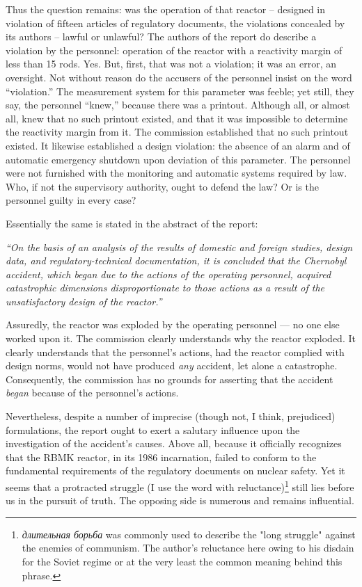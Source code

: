 \documentclass[openright]{bookest}
\begin{document}
Thus the question remains: was the operation of that reactor -- designed in violation of fifteen articles of regulatory documents, the violations concealed by its authors -- lawful or unlawful? The authors of the report do describe a violation by the personnel: operation of the reactor with a reactivity margin of less than \num{15} rods. Yes. But, first, that was not a violation; it was an error, an oversight. Not without reason do the accusers of the personnel insist on the word ``violation.'' The measurement system for this parameter was feeble; yet still, they say, the personnel ``knew,'' because there was a printout. Although all, or almost all, knew that no such printout existed, and that it was impossible to determine the reactivity margin from it. The commission established that no such printout existed. It likewise established a design violation: the absence of an alarm and of automatic emergency shutdown upon deviation of this parameter. The personnel were not furnished with the monitoring and automatic systems required by law. Who, if not the supervisory authority, ought to defend the law? Or is the personnel guilty in every case?

Essentially the same is stated in the abstract of the report:

\begin{personal}
\textit{``On the basis of an analysis of the results of domestic and foreign studies, design data, and regulatory-technical documentation, it is concluded that the Chernobyl accident, which began due to the actions of the operating personnel, acquired catastrophic dimensions disproportionate to those actions as a result of the unsatisfactory design of the reactor.''}
\end{personal}

Assuredly, the reactor was exploded by the operating personnel --- no one else worked upon it. The commission clearly understands why the reactor exploded. It clearly understands that the personnel's actions, had the reactor complied with design norms, would not have produced \textit{any} accident, let alone a catastrophe. Consequently, the commission has no grounds for asserting that the accident \textit{began} because of the personnel's actions.

Nevertheless, despite a number of imprecise (though not, I think, prejudiced) formulations, the report ought to exert a salutary influence upon the investigation of the accident's causes. Above all, because it officially recognizes that the RBMK reactor, in its 1986 incarnation, failed to conform to the fundamental requirements of the regulatory documents on nuclear safety. Yet it seems that a protracted struggle (I use the word with reluctance)\footnote{\textit{длительная борьба} was commonly used to describe the "long struggle" against the enemies of communism. The author's reluctance here owing to his disdain for the Soviet regime or at the very least the common meaning behind this phrase.} still lies before us in the pursuit of truth. The opposing side is numerous and remains influential.
\end{document}
